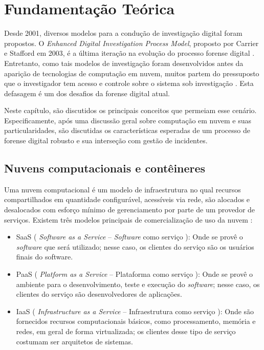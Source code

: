 \chapter{Fundamentação Teórica}
\label{chp:fundamentação}


Desde 2001, diversos modelos para a condução de investigação digital foram propostos. 
%
O \textit{Enhanced Digital Investigation Process Model}, proposto por Carrier e Stafford em 2003, é a última iteração na evolução do processo forense digital \cite{GrisposChallengesCloudComputing:2012}.
%
Entretanto, como tais modelos de investigação foram desenvolvidos antes da aparição de tecnologias de computação em nuvem, muitos partem do pressuposto que o investigador tem acesso e controle sobre o sistema sob investigação \cite{GrisposChallengesCloudComputing:2012}.
%
Esta defasagem é um dos desafios da forense digital atual.


Neste capítulo, são discutidos os principais conceitos que permeiam esse cenário.
%
Especificamente, após uma discussão geral sobre computação em nuvem e suas particularidades, são discutidas os características esperadas de um processo de forense digital robusto e sua interseção com gestão de incidentes.


\section{Nuvens computacionais e contêineres}
\label{sec:computacaonuvem}

Uma nuvem computacional é um modelo de infraestrutura no qual recursos compartilhados em quantidade configurável, acessíveis via rede, são alocados e desalocados com esforço mínimo de gerenciamento por parte de um provedor de serviços.
%
Existem três modelos principais de comercialização de uso da nuvem \cite{NIST2011}: 

\begin{itemize}
	\item SaaS ( \textit{Software as a Service} -- \textit{Software} como serviço ): Onde se provê o \textit{software} que será utilizado; nesse caso, os clientes do serviço são os usuários finais do software.
	
	\item PaaS ( \textit{Platform as a Service} -- Plataforma como serviço ): Onde se provê o ambiente para o desenvolvimento, teste e execução do \textit{software}; nesse caso, os clientes do serviço são desenvolvedores de aplicações.
	
	\item IaaS ( \textit{Infrastructure as a Service} -- Infraestrutura como serviço ): Onde são fornecidos recursos computacionais básicos, como processamento, memória e redes, em geral de forma virtualizada; os clientes desse tipo de serviço costumam ser arquitetos de sistemas.
\end{itemize}


